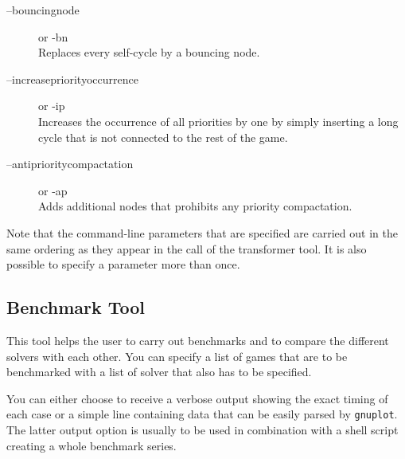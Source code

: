 \begin{description}
\item[{\ttfamily --bouncingnode}] \enspace or {\ttfamily -bn} \\
   Replaces every self-cycle by a bouncing node.

 \item[{\ttfamily --increasepriorityoccurrence}] \enspace or {\ttfamily -ip} \\
   Increases the occurrence of all priorities by one by simply inserting a long cycle that is not
   connected to the rest of the game.

\item[{\ttfamily --antiprioritycompactation}] \enspace or {\ttfamily -ap} \\
   Adds additional nodes that prohibits any priority compactation.
\end{description}

Note that the command-line parameters that are specified are carried out in the same ordering as they
appear in the call of the transformer tool. It is also possible to specify a parameter more than once.


\subsection{Benchmark Tool}

This tool helps the user to carry out benchmarks and to compare the different solvers with each other. 
You can specify a list of games that are to be benchmarked with a list of solver that also has to be 
specified.

You can either choose to receive a verbose output showing the exact timing of each case or a simple line 
containing data that can be easily parsed by \texttt{gnuplot}. The latter output option is usually to be 
used in combination with a shell script creating a whole benchmark series.

